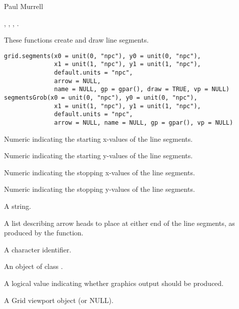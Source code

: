%
\begin{Author}\relax
Paul Murrell
\end{Author}
%
\begin{SeeAlso}\relax
{}, ,
, .
\end{SeeAlso}
%
\begin{Description}\relax
These functions create and draw line segments.
\end{Description}
%
\begin{Usage}
\begin{verbatim}
grid.segments(x0 = unit(0, "npc"), y0 = unit(0, "npc"),
              x1 = unit(1, "npc"), y1 = unit(1, "npc"),
              default.units = "npc", 
              arrow = NULL,
              name = NULL, gp = gpar(), draw = TRUE, vp = NULL)
segmentsGrob(x0 = unit(0, "npc"), y0 = unit(0, "npc"),
              x1 = unit(1, "npc"), y1 = unit(1, "npc"),
              default.units = "npc", 
              arrow = NULL, name = NULL, gp = gpar(), vp = NULL)
\end{verbatim}
\end{Usage}
%
\begin{Arguments}
\begin{ldescription}
\item[\code{x0}]  Numeric indicating the starting x-values of the line segments. 
\item[\code{y0}]  Numeric indicating the starting y-values of the line
segments. 
\item[\code{x1}]  Numeric indicating the stopping x-values of the line
segments. 
\item[\code{y1}]  Numeric indicating the stopping y-values of the line segments.
\item[\code{default.units}]  A string. 
\item[\code{arrow}] A list describing arrow heads to place at either end
of the line segments, as produced by the  function.
\item[\code{name}]  A character identifier. 
\item[\code{gp}]  An object of class . 
\item[\code{draw}]  A logical value indicating whether graphics output
should be produced.
\item[\code{vp}] A Grid viewport object (or NULL).
\end{ldescription}
\end{Arguments}
